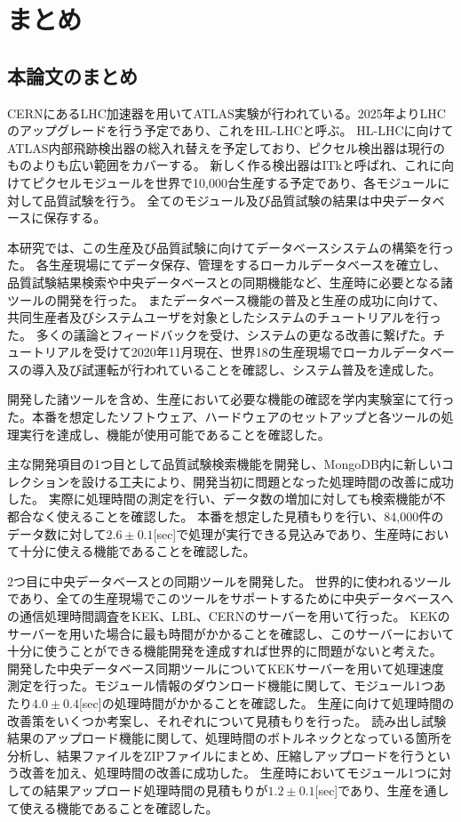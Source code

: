 \chapter{まとめ}

\section{本論文のまとめ}
CERNにあるLHC加速器を用いてATLAS実験が行われている。2025年よりLHCのアップグレードを行う予定であり、これをHL-LHCと呼ぶ。
HL-LHCに向けてATLAS内部飛跡検出器の総入れ替えを予定しており、ピクセル検出器は現行のものよりも広い範囲をカバーする。
新しく作る検出器はITkと呼ばれ、これに向けてピクセルモジュールを世界で10,000台生産する予定であり、各モジュールに対して品質試験を行う。
全てのモジュール及び品質試験の結果は中央データベースに保存する。

本研究では、この生産及び品質試験に向けてデータベースシステムの構築を行った。
各生産現場にてデータ保存、管理をするローカルデータベースを確立し、品質試験結果検索や中央データベースとの同期機能など、生産時に必要となる諸ツールの開発を行った。
またデータベース機能の普及と生産の成功に向けて、共同生産者及びシステムユーザを対象としたシステムのチュートリアルを行った。
多くの議論とフィードバックを受け、システムの更なる改善に繋げた。チュートリアルを受けて2020年11月現在、世界18の生産現場でローカルデータベースの導入及び試運転が行われていることを確認し、システム普及を達成した。

開発した諸ツールを含め、生産において必要な機能の確認を学内実験室にて行った。本番を想定したソフトウェア、ハードウェアのセットアップと各ツールの処理実行を達成し、機能が使用可能であることを確認した。

主な開発項目の1つ目として品質試験検索機能を開発し、MongoDB内に新しいコレクションを設ける工夫により、開発当初に問題となった処理時間の改善に成功した。
実際に処理時間の測定を行い、データ数の増加に対しても検索機能が不都合なく使えることを確認した。
本番を想定した見積もりを行い、84,000件のデータ数に対して$2.6\pm0.1$[sec]で処理が実行できる見込みであり、生産時において十分に使える機能であることを確認した。

2つ目に中央データベースとの同期ツールを開発した。
世界的に使われるツールであり、全ての生産現場でこのツールをサポートするために中央データベースへの通信処理時間調査をKEK、LBL、CERNのサーバーを用いて行った。
KEKのサーバーを用いた場合に最も時間がかかることを確認し、このサーバーにおいて十分に使うことができる機能開発を達成すれば世界的に問題がないと考えた。
開発した中央データベース同期ツールについてKEKサーバーを用いて処理速度測定を行った。モジュール情報のダウンロード機能に関して、モジュール1つあたり$4.0\pm 0.4$[sec]の処理時間がかかることを確認した。
生産に向けて処理時間の改善策をいくつか考案し、それぞれについて見積もりを行った。
読み出し試験結果のアップロード機能に関して、処理時間のボトルネックとなっている箇所を分析し、結果ファイルをZIPファイルにまとめ、圧縮しアップロードを行うという改善を加え、処理時間の改善に成功した。
生産時においてモジュール1つに対しての結果アップロード処理時間の見積もりが$1.2\pm 0.1$[sec]であり、生産を通して使える機能であることを確認した。

